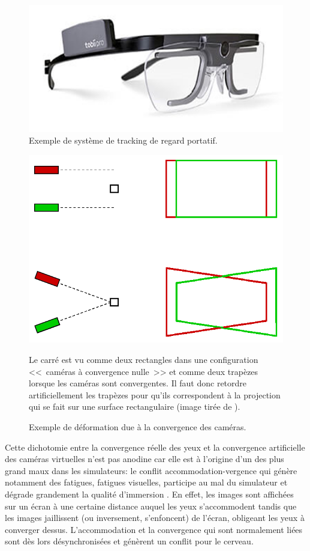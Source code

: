 	\begin{figure}[h]
		\centering
		\includegraphics[scale=1]{Figures/EyeTrackerTobii}
		\caption{Exemple de système de tracking de regard portatif.}
		\label{fig:eye_tracker}
	\end{figure}
	
	\begin{figure}[h]
		\centering
		\includegraphics[scale=.75]{Figures/RedressementPlansVision}
		\caption{Exemple de déformation due à la convergence des caméras.}{Le carré est vu comme deux rectangles dans une configuration <<~caméras à convergence nulle~>> et comme deux trapèzes lorsque les caméras sont convergentes. Il faut donc retordre artificiellement les trapèzes pour qu'ils correspondent à la projection qui se fait sur une surface rectangulaire (image tirée de \citep{aurat_immersion_2016}).}
		\label{fig:redressement_plan_vision}
	\end{figure}
	
	\par Cette dichotomie entre la convergence réelle des yeux et la convergence artificielle des caméras virtuelles n'est pas anodine car elle est à l'origine d'un des plus grand maux dans les simulateurs: le conflit accommodation-vergence qui génère notamment des fatigues, fatigues visuelles, participe au mal du simulateur et dégrade grandement la qualité d'immersion \citep{neveu_impact_2012}. En effet, les images sont affichées sur un écran à une certaine distance auquel les yeux s'accommodent tandis que les images jaillissent (ou inversement, s'enfoncent) de l'écran, obligeant les yeux à converger dessus. L'accommodation et la convergence qui sont normalement liées sont dès lors désynchronisées et génèrent un conflit pour le cerveau.
	

